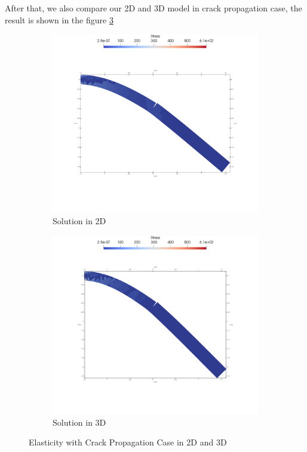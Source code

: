 \documentclass[a4paper,11pt]{article}
\begin{document}
\newpage
After that, we also compare our 2D and 3D model in crack propagation case, the result is shown in the figure \ref{fig:compelast}\\
\begin{figure}[h!]
	\begin{subfigure}[b]{0.5\linewidth}
		\centering
		\includegraphics[width=\linewidth]{picture/conference/compare2d}
		\caption{Solution in 2D}
		\label{fig:2dcomp}
	\end{subfigure}
	\quad
	\begin{subfigure}[b]{0.5\linewidth}
		\centering
		\includegraphics[width=\linewidth]{picture/conference/compare3d}
		\caption{Solution in 3D}
		\label{fig:3dcomp}
	\end{subfigure}
	\caption{Elasticity with Crack Propagation Case in 2D and 3D}
	\label{fig:compelast}
\end{figure}
\end{document}
